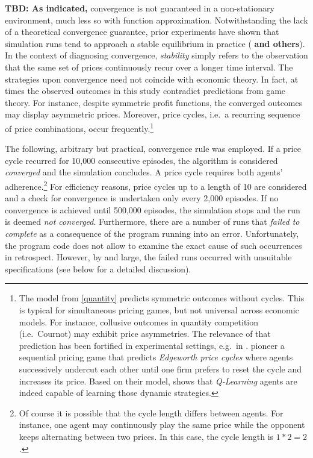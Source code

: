 \textbf{TBD: As indicated,} convergence is not guaranteed in a non-stationary environment, much less so with function approximation. Notwithstanding the lack of a theoretical convergence guarantee, prior experiments have shown that simulation runs tend to approach a stable equilibrium in practice (\cite{calvano_artificial_2020} \textbf{and others}). In the context of diagnosing convergence, \emph{stability} simply refers to the observation that the same set of prices continuously recur over a longer time interval. The strategies upon convergence need not coincide with economic theory. In fact, at times the observed outcomes in this study contradict predictions from game theory. For instance, despite symmetric profit functions, the converged outcomes may display asymmetric prices. Moreover, price cycles, i.e.\ a recurring sequence of price combinations, occur frequently.\footnote{The model from \autoref{quantity} predicts symmetric outcomes without cycles. This is typical for simultaneous pricing games, but not universal across economic models. For instance, collusive outcomes in quantity competition (i.e.\ Cournot) may exhibit price asymmetries. The relevance of that prediction has been fortified in experimental settings, e.g.\ in \textcite{fischer_collusion_2019}. \textcite{maskin_theory_1988} pioneer a sequential pricing game that predicts \emph{Edgeworth price cycles} where agents successively undercut each other until one firm prefers to reset the cycle and increases its price. Based on their model, \textcite{klein_autonomous_2019} shows that \emph{Q-Learning} agents are indeed capable of learning those dynamic strategies.}

The following, arbitrary but practical, convergence rule was employed. If a price cycle recurred for 10,000 consecutive episodes, the algorithm is considered \emph{converged} and the simulation concludes. A price cycle requires both agents' adherence.\footnote{Of course it is possible that the cycle length differs between agents. For instance, one agent may continuously play the same price while the opponent keeps alternating between two prices. In this case, the cycle length is $1*2=2$.} For efficiency reasons, price cycles up to a length of 10 are considered and a check for convergence is undertaken only every 2,000 episodes. If no convergence is achieved until 500,000 episodes, the simulation stops and the run is deemed \emph{not converged}. Furthermore, there are a number of runs that \emph{failed to complete} as a consequence of the program running into an error. Unfortunately, the program code does not allow to examine the exact cause of such occurrences in retrospect. However, by and large, the failed runs occurred with unsuitable specifications (see below for a detailed discussion).

